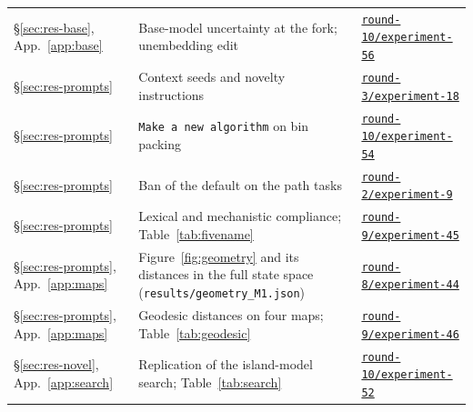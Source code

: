\documentclass[11pt,letterpaper]{article}
\begin{document}
{\begin{longtable}{@{}L{2.1cm}L{8.9cm}L{4.6cm}@{}}
\S\ref{sec:res-base}, App.~\ref{app:base} & Base-model uncertainty at the fork; unembedding edit & \href{https://github.com/ai-inventor-papers/ai-invention-295f8e-prompt-bans-substitute-not-just-subtract/tree/fork/run_jSassd-YWLVC/round-10/experiment-56}{\texttt{round-10/experiment-56}} \\
\S\ref{sec:res-prompts} & Context seeds and novelty instructions & \href{https://github.com/ai-inventor-papers/ai-invention-295f8e-prompt-bans-substitute-not-just-subtract/tree/fork/run_jSassd-YWLVC/round-3/experiment-18}{\texttt{round-3/experiment-18}} \\
\S\ref{sec:res-prompts} & \texttt{Make a new algorithm} on bin packing & \href{https://github.com/ai-inventor-papers/ai-invention-295f8e-prompt-bans-substitute-not-just-subtract/tree/fork/run_jSassd-YWLVC/round-10/experiment-54}{\texttt{round-10/experiment-54}} \\
\S\ref{sec:res-prompts} & Ban of the default on the path tasks & \href{https://github.com/ai-inventor-papers/ai-invention-295f8e-prompt-bans-substitute-not-just-subtract/tree/fork/run_jSassd-YWLVC/round-2/experiment-9}{\texttt{round-2/experiment-9}} \\
\S\ref{sec:res-prompts} & Lexical and mechanistic compliance; Table~\ref{tab:fivename} & \href{https://github.com/ai-inventor-papers/ai-invention-295f8e-prompt-bans-substitute-not-just-subtract/tree/fork/run_jSassd-YWLVC/round-9/experiment-45}{\texttt{round-9/experiment-45}} \\
\S\ref{sec:res-prompts}, App.~\ref{app:maps} & Figure~\ref{fig:geometry} and its distances in the full state space (\texttt{results/geometry\_M1.json}) & \href{https://github.com/ai-inventor-papers/ai-invention-295f8e-prompt-bans-substitute-not-just-subtract/tree/fork/run_jSassd-YWLVC/round-8/experiment-44}{\texttt{round-8/experiment-44}} \\
\S\ref{sec:res-prompts}, App.~\ref{app:maps} & Geodesic distances on four maps; Table~\ref{tab:geodesic} & \href{https://github.com/ai-inventor-papers/ai-invention-295f8e-prompt-bans-substitute-not-just-subtract/tree/fork/run_jSassd-YWLVC/round-9/experiment-46}{\texttt{round-9/experiment-46}} \\
\S\ref{sec:res-novel}, App.~\ref{app:search} & Replication of the island-model search; Table~\ref{tab:search} & \href{https://github.com/ai-inventor-papers/ai-invention-295f8e-prompt-bans-substitute-not-just-subtract/tree/fork/run_jSassd-YWLVC/round-10/experiment-52}{\texttt{round-10/experiment-52}} \\

\end{longtable}}
\end{document}
